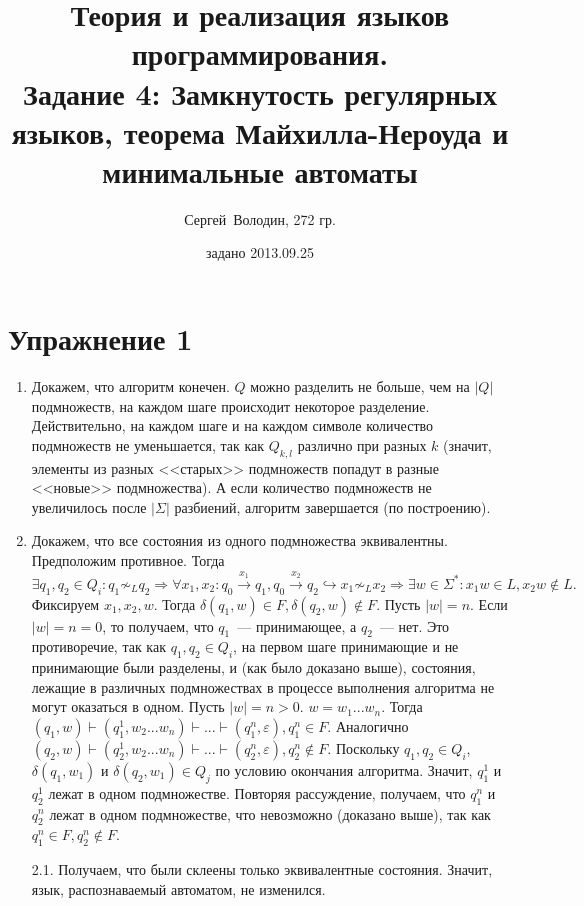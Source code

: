 \documentclass[a4paper]{article}
\title{Теория и реализация языков программирования.\\Задание 4: Замкнутость регулярных языков, теорема Майхилла-Нероуда и минимальные автоматы}
\date{задано 2013.09.25}
\author{Сергей~Володин, 272 гр.}
\begin{document}
\maketitle
\section*{Упражнение 1}
\begin{enumerate}[1.]
\item Докажем, что алгоритм конечен. $Q$ можно разделить не больше, чем на $|Q|$ подмножеств, на каждом шаге происходит некоторое разделение.\newline
Действительно, на каждом шаге и на каждом символе количество подмножеств не уменьшается, так как $Q_{k,l}$ различно при разных $k$ (значит, элементы из разных <<старых>> подмножеств попадут в разные <<новые>> подмножества).\newline
А если количество подмножеств не увеличилось после $|\Sigma|$ разбиений, алгоритм завершается (по построению).
\item Докажем, что все состояния из одного подмножества эквивалентны. Предположим противное. Тогда $$\exists q_1,q_2\in Q_i \colon q_1\not\sim_L q_2\Rightarrow \forall x_1,x_2\colon q_0\overset{x_1}{\longrightarrow}q_1, q_0\overset{x_2}{\longrightarrow}q_2\hookrightarrow x_1\not\sim_L x_2\Rightarrow \exists w\in\Sigma^*\colon x_1w\in L, x_2w\notin L.$$ Фиксируем $x_1,x_2,w$. Тогда $\delta(q_1,w)\in F, \delta(q_2,w)\notin F$. Пусть $|w|=n$.\newline
Если $|w|=n=0$, то получаем, что $q_1$~--- принимающее, а $q_2$~--- нет. Это противоречие, так как $q_1,q_2\in Q_i$, на первом шаге принимающие и не принимающие были разделены, и (как было доказано выше), состояния, лежащие в различных подмножествах в процессе выполнения алгоритма не могут оказаться в одном.\newline
Пусть $|w|=n>0$. $w=w_1...w_n$. Тогда $(q_1,w)\vdash(q^1_1,w_2...w_n)\vdash...\vdash(q^n_1,\varepsilon),q^n_1\in F$. Аналогично $(q_2,w)\vdash(q^1_2,w_2...w_n)\vdash...\vdash(q^n_2,\varepsilon),q^n_2\notin F$. Поскольку $q_1,q_2\in Q_i$, $\delta(q_1,w_1)$ и $\delta(q_2,w_1)\in Q_j$ по условию окончания алгоритма. Значит, $q^1_1$ и $q^1_2$ лежат в одном подмножестве. Повторяя рассуждение, получаем, что $q^n_1$ и $q^n_2$ лежат в одном подмножестве, что невозможно (доказано выше), так как $q^n_1\in F,q^n_2\notin F$.
\item[2.1.] Получаем, что были склеены только эквивалентные состояния. Значит, язык, распознаваемый автоматом, не изменился.

\end{enumerate}
\end{document}
